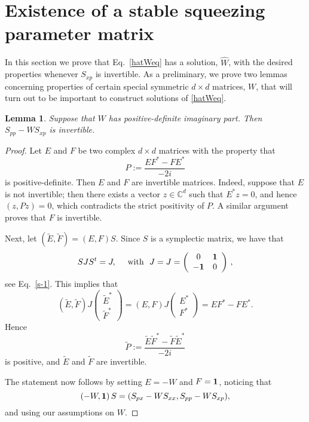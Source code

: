 \documentclass[11pt]{article}
\newtheorem{lemma}[theorem]{Lemma}
\begin{document}
\section{Existence of a stable squeezing parameter matrix}\label{sec:WM}
In this section we prove that Eq.~\eqref{hatWeq} has a solution, $\widehat{W}$, with the desired properties whenever $S_{xp}$ is invertible. As a preliminary, we prove two lemmas concerning properties of certain special symmetric $d \times d$ matrices, $W$, that will turn out to be important to construct solutions of \eqref{hatWeq}.

\begin{lemma}
\label{lem:invertible}
Suppose that $W$ has positive-definite imaginary part. Then $S_{pp} - WS_{xp}$ is invertible.
\end{lemma}
\begin{proof}
Let $E$ and $F$ be two complex $d\times d$ matrices with the property that 
$$
P:=\frac{E F^* - F E^*}{-2 i}
$$
is positive-definite. Then $E$ and $F$ are invertible matrices. Indeed, suppose that $E$ is not invertible; then there exists a vector $z \in \mathbb{C}^{d}$ such that $E^*z = 0$, and hence $(z,Pz) = 0$, which contradicts the strict positivity of $P$. 
A similar argument proves that $F$ is invertible.

Next, let $(\tilde{E}, \tilde{F}) = (E,F) S$. Since $S$ is a symplectic matrix, we have that
$$SJS^t = J, \quad \text{ with }\,\, J=J =\left( \begin{array}{cc}
		0 & {\bf{1}} \\
		-{\bf{1}} & 0 
		\end{array} \right)\,,$$
 see Eq.~\eqref{s-1}. This implies that 
$$
\left( \tilde{E}, \tilde{F} \right) J \left( \begin{array}{r} 
						\tilde{E}^* \\
						\tilde{F}^*
					\end{array} \right) = \left( E, F \right) J \left( \begin{array}{r} 
						E^* \\
						F^*
					\end{array} \right) = EF^* - F E^*.
$$
Hence 
$$
\tilde{P}:=\frac{\tilde{E} \tilde{F}^* - \tilde{F} \tilde{E}^*}{-2 i}
$$
is positive, and  $\tilde{E}$ and $\tilde{F}$ are invertible.

The statement now follows by setting $E=-W$ and $F={\bf{1}}$, noticing that
$$
\left(-W, {\bf{1}}\right) S = (S_{px} - WS_{xx}, S_{pp} -WS_{xp}),
$$
and using our assumptions on $W$. 
\end{proof}
\end{document}
